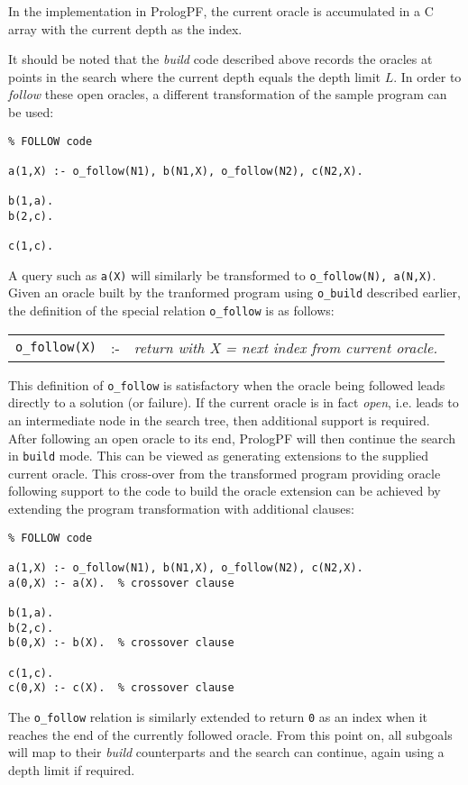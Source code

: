 In the implementation in PrologPF, the current oracle is accumulated in a C array with
the current depth as the index.

It should be noted that the \textit{build} code described above records the oracles at
points in the search where the current depth equals the depth limit $L$.  In order to
\textit{follow} these open oracles, a different transformation of the sample program
can be used:
\begin{verbatim}
% FOLLOW code

a(1,X) :- o_follow(N1), b(N1,X), o_follow(N2), c(N2,X).

b(1,a).
b(2,c).

c(1,c).
\end{verbatim}
A query such as \texttt{a(X)} will similarly be transformed to \texttt{o\_{}follow(N), a(N,X)}.
Given an oracle built by the tranformed program using \texttt{o\_{}build} described earlier, the
definition of the special relation \texttt{o\_{}follow} is as follows:\\
\begin{tabular}{l l l}
\texttt{o\_{}follow(X)}   & :- & \textit{return with X = next index from current oracle.}
\end{tabular}

This definition of \texttt{o\_{}follow} is satisfactory when the oracle being followed leads
directly to a solution (or failure).  If the current oracle is in fact \textit{open}, i.e. leads
to an intermediate node in the search tree, then additional support is required.  After following an
open oracle to its end, PrologPF will then continue the search in \texttt{build} mode.  This can
be viewed as generating extensions to the supplied current oracle.  This cross-over from the
transformed program providing oracle following support to the code to build the oracle extension
can be achieved by extending the program transformation with additional clauses:
\begin{verbatim}
% FOLLOW code

a(1,X) :- o_follow(N1), b(N1,X), o_follow(N2), c(N2,X).
a(0,X) :- a(X).  % crossover clause

b(1,a).
b(2,c).
b(0,X) :- b(X).  % crossover clause

c(1,c).
c(0,X) :- c(X).  % crossover clause
\end{verbatim}
The \texttt{o\_{}follow} relation is similarly extended to return \texttt{0} as an index
when it reaches the end of the currently followed oracle.  From this point on, all subgoals will
map to their \textit{build} counterparts and the search can continue, again using a depth limit
if required.

